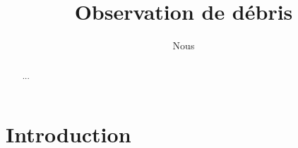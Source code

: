\documentclass[11pt,a4paper,reqno]{article}
\author{Nous}
\begin{document}
\title{Observation de débris}

\maketitle
\begin{abstract}
  ...
\end{abstract}

\section{Introduction}
\end{document}
